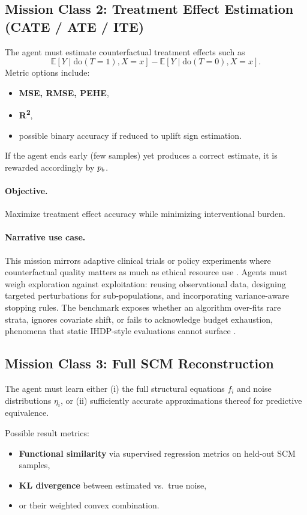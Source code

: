 \subsection{Mission Class 2: Treatment Effect Estimation (CATE / ATE / ITE)}
The agent must estimate counterfactual treatment effects such as
\[
    \mathbb{E}[Y \mid \mathrm{do}(T\!=\!1), X = x] - \mathbb{E}[Y \mid \mathrm{do}(T\!=\!0), X = x].
\]
Metric options include:
\begin{itemize}
    \item \textbf{MSE, RMSE, PEHE},
    \item \textbf{R\textsuperscript{2}}, 
    \item possible binary accuracy if reduced to uplift sign estimation.
\end{itemize}
If the agent ends early (few samples) yet produces a correct estimate, it is rewarded accordingly by $p_b$.

\paragraph{Objective.} Maximize treatment effect accuracy while minimizing interventional burden.

\paragraph{Narrative use case.}
This mission mirrors adaptive clinical trials or policy experiments where counterfactual quality matters as much as ethical resource use \citep{Prosperi2020CausalIAA,lalonde1986evaluating}. Agents must weigh exploration against exploitation: reusing observational data, designing targeted perturbations for sub-populations, and incorporating variance-aware stopping rules. The benchmark exposes whether an algorithm over-fits rare strata, ignores covariate shift, or fails to acknowledge budget exhaustion, phenomena that static IHDP-style evaluations cannot surface \citep{RealCause2021,curth2021really}.

\subsection{Mission Class 3: Full SCM Reconstruction}
The agent must learn either (i) the full structural equations $f_i$ and noise distributions $\eta_i$, or (ii) sufficiently accurate approximations thereof for predictive equivalence.

Possible result metrics:
\begin{itemize}
    \item \textbf{Functional similarity} via supervised regression metrics on held-out SCM samples,
    \item \textbf{KL divergence} between estimated vs.\ true noise,
    \item or their weighted convex combination.
\end{itemize}

